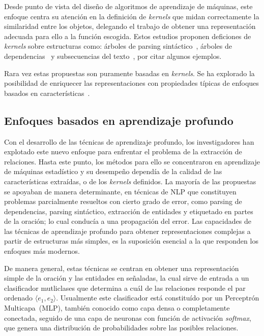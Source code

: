 Desde punto de vista del diseño de algoritmos de aprendizaje de máquinas, este enfoque centra su atención en la definición de \textit{kernels} que midan correctamente la similaridad entre los objetos, delegando el trabajo de obtener una representación adecuada para ello a la función escogida.
Estos estudios proponen deficiones de \textit{kernels} sobre estructuras como: árboles de parsing sintáctico~\cite{zelenko2003kernel, zhao2005extracting, zhang2006composite, zhou2007tree}, árboles de dependencias~\cite{culotta2004dependency, bunescu2005shortest, zhao2005extracting} y subsecuencias del texto~\cite{zhao2005extracting, mooney2006subsequence}, por citar algunos ejemplos.

Rara vez estas propuestas son puramente basadas en \textit{kernels}.
Se ha explorado la posibilidad de enriquecer las representaciones con propiedades típicas de enfoques basados en características~\cite{culotta2004dependency, bunescu2005shortest, zhang2006composite, zhao2005extracting}.

\subsection{Enfoques basados en aprendizaje profundo}

Con el desarrollo de las técnicas de aprendizaje profundo, los investigadores han explotado este nuevo enfoque para enfrentar el problema de la extracción de relaciones.
Hasta este punto, los métodos para ello se concentraron en aprendizaje de máquinas estadístico y su desempeño dependía de la calidad de las características extraídas, o de los \textit{kernels} definidos.
La mayoría de las propuestas se apoyaban de manera determinante, en técnicas de NLP que constituyen problemas parcialmente resueltos con cierto grado de error, como parsing de dependencias, parsing sintáctico, extracción de entidades y etiquetado en partes de la oración; lo cual conducía a una propagación del error.
Las capacidades de las técnicas de aprendizaje profundo para obtener representaciones complejas a partir de estructuras más simples, es la suposición esencial a la que responden los enfoques más modernos.

De manera general, estas técnicas se centran en obtener una representación simple de la oración y las entidades en señaladas, la cual sirve de entrada a un clasificador mutliclases que determina a cuál de las relaciones responde el par ordenado $\langle e_1,e_2\rangle$.
Usualmente este clasificador está constituído por un Perceptrón Multicapa~(MLP), también conocido como capa densa o completamente conectada, seguido de una capa de neuronas con función de activación \textit{softmax}, que genera una distribución de probabilidades sobre las posibles relaciones.

